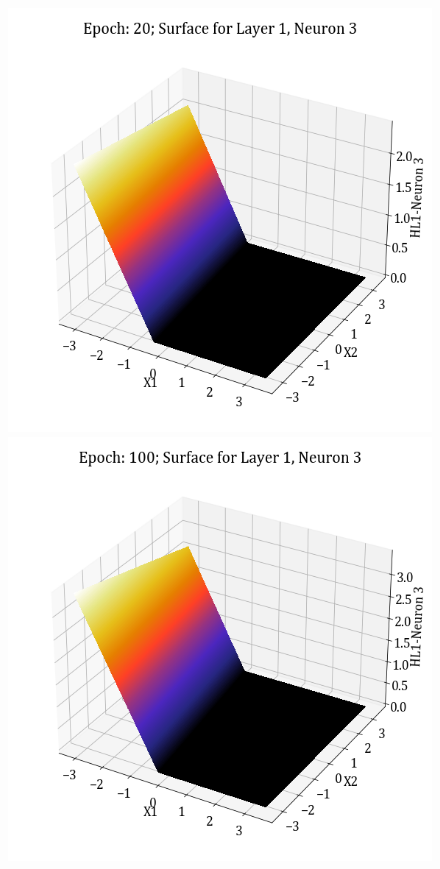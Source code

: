 \documentclass[11pt,a4paper]{article}
\begin{document}
\begin{figure}[H]
    \includegraphics[scale=0.4]{images/1B_MLFFNN_E20_HL1_N3.png}
    \includegraphics[scale=0.4]{images/1B_MLFFNN_E100_HL1_N3.png}

\end{figure}
\end{document}
